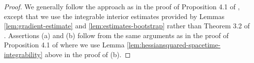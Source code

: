 \documentclass[12pt]{amsart}
\theoremstyle{plain}
\theoremstyle{plain}
\theoremstyle{definition}
\theoremstyle{remark}
\numberwithin{equation}{subsection}
\newcommand{\del}{\nabla}
\newcommand{\hdel}{\tilde{\nabla}}
\begin{document}
\begin{proof}
    We generally follow the approach as in the proof of Proposition 4.1 of \cite{jiang_weak_2021}, except that we use the integrable interior estimates provided by Lemmas \ref{lem:gradient-estimate} and \ref{lem:estimates-bootstrap} rather than Theorem 3.2 of \cite{jiang_weak_2021}. Assertions (a) and (b) follow from the same arguments as in the proof of Proposition 4.1 of \cite{jiang_weak_2021} where we use Lemma \ref{lem:hessiansquared-spacetime-integrability} above in the proof of (b).

    \begin{comment}
    For (a), we have
    \begin{equation*}
        u(x,t) \leq \lVert\tilde{u}\rVert_{L^\infty(M)}\int_M H(y,T;x,t)d\mu_{g(T)}(y).
    \end{equation*}
    Denote by $F(t,T):= \int_M H(y,T;x,t)d\mu_{g(T)}(y)$. Then by stochastic completeness, we have $\lim\limits_{T\to t^+}F(t,T) = 1$. By the fact that $H$ satisfies $\Box H = 0$ and by computing the evolution of the volume form, we have
    \begin{align}\label{eqn:u-estimate-F-estimate}
        &\frac{\partial}{\partial T} F(t,T) \nonumber \\
        &\quad= \int_M\left(\Delta_yH(y,T;x,t) - R_TH(y,T;x,t) - \text{div}(X)H(y,T;x,t)\right)d\mu_{g(T)}(y) \nonumber \\
        &\quad= \int_M \left(-R_TH(y,T;x,t)-\text{div}(X)H(y,T;x,t)\right)d\mu_{g(T)}(y) \nonumber \\
        &\quad\leq \int_M C_1\left(|R_T| + |\del X|\right)H(y,T;x,t)d\mu_{g(T)}(y) \nonumber \\
        &\quad\leq \frac{C(n,k_1,k_2,\Lambda,L_0,p,\delta)}{T^{1-\frac{\delta}{2p}}}F(t,T)
    \end{align}
    where the last inequality is by Lemmas \ref{lem:gradient-estimate} and \ref{lem:estimates-bootstrap} and observing that both $|R_T|$ and $|\del X|$ are of the order $|\hdel^2 g| + |\hdel g|^2$. Then integrating $\log(F(t,s))$ in $s$ from $t$ to $T$, by $\lim\limits_{T\to t^+}F(t,T) = 1$ and (\ref{eqn:u-estimate-F-estimate}) above we obtain
    \begin{align*}
        \log(F(t,T)) &= \log(F(t,T)) - \lim\limits_{s\to t^+}\log(F(t,s)) \nonumber \\
        &= \int_t^T \partial_s \log(F(t,s))ds \nonumber \\
        &\leq \int_t^T \frac{C(n,k_1,k_2,\Lambda,L_0,p,\delta)}{s^{1-\frac{\delta}{2p}}}ds \nonumber \\
        &\leq C(n,k_1,k_2,\Lambda,L_0,p,\delta)
    \end{align*}
    from which we obtain (a).


\end{comment}
\end{proof}
\end{document}
